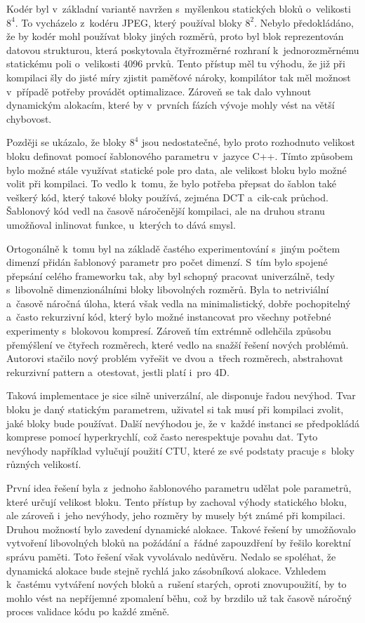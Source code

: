 Kodér byl v~základní variantě navržen s~myšlenkou statických bloků o~velikosti $8^4$.
To vycházelo z~kodéru JPEG, který používal bloky $8^2$.
Nebylo předokládáno, že by kodér mohl používat bloky jiných roz\-měrů, proto byl blok reprezentován datovou strukturou, která poskytovala čtyřroz\-měrné rozhraní k~jednoroz\-měrnému statickému poli o~velikosti 4096 prvků.
Tento přístup měl tu výhodu, že již při kompilaci šly do jisté míry zjistit paměťové nároky, kompilátor tak měl možnost v~případě potřeby provádět optimalizace.
Zároveň se tak dalo vyhnout dynamickým alokacím, které by v~prvních fázích vývoje mohly vést na větší chybovost.

Později se ukázalo, že bloky $8^4$ jsou nedostatečné, bylo proto rozhodnuto velikost bloku definovat pomocí šab\-lonového pa\-ra\-me\-tru v~jazyce C++.
Tímto způsobem bylo možné stále využívat statické pole pro data, ale velikost bloku bylo možné volit při kompilaci.
To vedlo k~tomu, že bylo potřeba přepsat do šab\-lon také veškerý kód, který takové bloky používá, zejména DCT a~cik-cak průchod.
Šablonový kód vedl na časově náročenější kompilaci, ale na druhou stranu umožňoval inlinovat funkce, u~kterých to dává smysl.

Ortogonálně k~tomu byl na základě častého experimentování s~jiným počtem dimenzí přidán šab\-lonový pa\-ra\-me\-tr pro počet dimenzí.
S~tím bylo spojené přepsání celého frameworku tak, aby byl schopný pracovat univerzálně, tedy s~libovolně dimenzionálními bloky libovolných roz\-měrů.
Byla to netriviální a~časově náročná úloha, která však vedla na minimalistický, dobře pochopitelný a~často rekurzivní kód, který bylo možné instancovat pro všechny potřebné experimenty s~blokovou kom\-pre\-sí.
Zároveň tím extrémně odlehčila způsobu přemýšlení ve čtyřech roz\-měrech, které vedlo na snažší řešení nových problémů.
Autorovi stačilo nový problém vyřešit ve dvou a~třech roz\-měrech, abstrahovat rekurzivní pattern a~otestovat, jestli platí i~pro 4D.

Taková implementace je sice silně univerzální, ale disponuje řadou nevýhod.
Tvar bloku je daný statickým pa\-ra\-me\-trem, uživatel si tak musí při kompilaci zvolit, jaké bloky bude používat.
Další nevýhodou je, že v~každé instanci se předpokládá kom\-pre\-se pomocí hyperkrychlí, což často nerespektuje povahu dat.
Tyto nevýhody například vylučují použití CTU, které ze své podstaty pracuje s~bloky různých velikostí.

První idea řešení byla z~jednoho šab\-lonového pa\-ra\-me\-tru udělat pole pa\-ra\-me\-trů, které určují velikost bloku.
Tento přístup by zachoval výhody statického bloku, ale zároveň i~jeho nevýhody, jeho roz\-měry by musely být známé při kompilaci.
Druhou možností bylo zavedení dynamické alokace.
Takové řešení by umožňovalo vytvoření libovolných bloků na požádání a~řádné zapouzdření by řešilo korektní správu paměti.
Toto řešení však vyvolávalo nedůvěru.
Nedalo se spoléhat, že dynamická alokace bude stejně rychlá jako zásobníková alokace.
Vzhledem k~častému vytváření nových bloků a~rušení starých, oproti znovupoužití, by to mohlo vést na nepříjemné zpomalení běhu, což by brzdilo už tak časově náročný proces validace kódu po každé změně.


